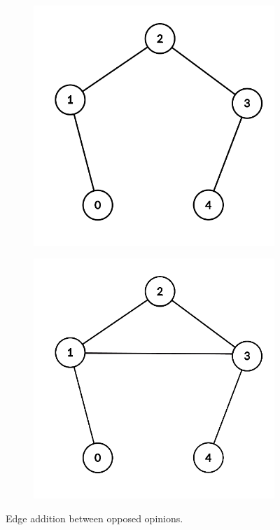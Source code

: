 \begin{figure}[h]
	\centering
	\begin{subfigure}[t]{0.3\textwidth}
		\centering
		\includegraphics[height=0.15\textheight]{Figures/p5A}
		\caption{}
		\label{subfig:monotonicityA}
	\end{subfigure}
	\hfill
	\begin{subfigure}[t]{0.3\textwidth}
		\centering
		\includegraphics[height=0.15\textheight]{Figures/p5B}
		\caption{}
		\label{subfig:monotonicityB}
	\end{subfigure}
	\vspace{40pt}
	\hfill
	\caption{Edge addition between opposed opinions.}
	\label{fig:p5}
\end{figure}
\\

